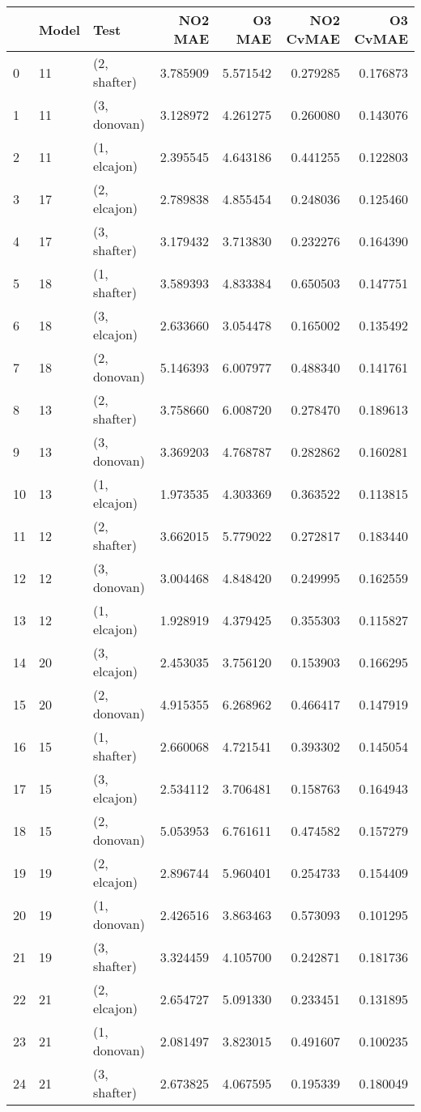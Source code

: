 \begin{tabular}{lllrrrr}
\toprule
{} & Model &          Test &   NO2 MAE &    O3 MAE &  NO2 CvMAE &  O3 CvMAE \\
\midrule
0  &    11 &  (2, shafter) &  3.785909 &  5.571542 &   0.279285 &  0.176873 \\
1  &    11 &  (3, donovan) &  3.128972 &  4.261275 &   0.260080 &  0.143076 \\
2  &    11 &  (1, elcajon) &  2.395545 &  4.643186 &   0.441255 &  0.122803 \\
3  &    17 &  (2, elcajon) &  2.789838 &  4.855454 &   0.248036 &  0.125460 \\
4  &    17 &  (3, shafter) &  3.179432 &  3.713830 &   0.232276 &  0.164390 \\
5  &    18 &  (1, shafter) &  3.589393 &  4.833384 &   0.650503 &  0.147751 \\
6  &    18 &  (3, elcajon) &  2.633660 &  3.054478 &   0.165002 &  0.135492 \\
7  &    18 &  (2, donovan) &  5.146393 &  6.007977 &   0.488340 &  0.141761 \\
8  &    13 &  (2, shafter) &  3.758660 &  6.008720 &   0.278470 &  0.189613 \\
9  &    13 &  (3, donovan) &  3.369203 &  4.768787 &   0.282862 &  0.160281 \\
10 &    13 &  (1, elcajon) &  1.973535 &  4.303369 &   0.363522 &  0.113815 \\
11 &    12 &  (2, shafter) &  3.662015 &  5.779022 &   0.272817 &  0.183440 \\
12 &    12 &  (3, donovan) &  3.004468 &  4.848420 &   0.249995 &  0.162559 \\
13 &    12 &  (1, elcajon) &  1.928919 &  4.379425 &   0.355303 &  0.115827 \\
14 &    20 &  (3, elcajon) &  2.453035 &  3.756120 &   0.153903 &  0.166295 \\
15 &    20 &  (2, donovan) &  4.915355 &  6.268962 &   0.466417 &  0.147919 \\
16 &    15 &  (1, shafter) &  2.660068 &  4.721541 &   0.393302 &  0.145054 \\
17 &    15 &  (3, elcajon) &  2.534112 &  3.706481 &   0.158763 &  0.164943 \\
18 &    15 &  (2, donovan) &  5.053953 &  6.761611 &   0.474582 &  0.157279 \\
19 &    19 &  (2, elcajon) &  2.896744 &  5.960401 &   0.254733 &  0.154409 \\
20 &    19 &  (1, donovan) &  2.426516 &  3.863463 &   0.573093 &  0.101295 \\
21 &    19 &  (3, shafter) &  3.324459 &  4.105700 &   0.242871 &  0.181736 \\
22 &    21 &  (2, elcajon) &  2.654727 &  5.091330 &   0.233451 &  0.131895 \\
23 &    21 &  (1, donovan) &  2.081497 &  3.823015 &   0.491607 &  0.100235 \\
24 &    21 &  (3, shafter) &  2.673825 &  4.067595 &   0.195339 &  0.180049 \\
\bottomrule
\end{tabular}
